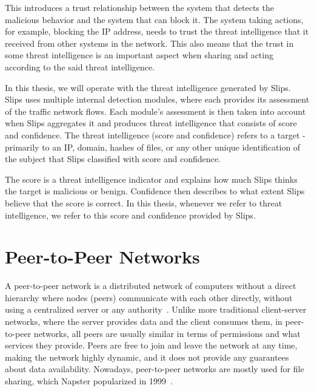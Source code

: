 This introduces a trust relationship between the system that detects the malicious behavior and the system that can block it.
The system taking actions, for example, blocking the IP address, needs to trust the threat intelligence that it received from other systems in the network.
This also means that the trust in some threat intelligence is an important aspect when sharing and acting according to the said threat intelligence.

In this thesis, we will operate with the threat intelligence generated by Slips.
Slips uses multiple internal detection modules, where each provides its assessment of the traffic network flows. 
Each module's assessment is then taken into account when Slips aggregates it and produces threat intelligence that consists of score and confidence.
The threat intelligence (score and confidence) refers to a target - primarily to an IP, domain, hashes of files, or any other unique identification of the subject that Slips classified with score and confidence.

The score is a threat intelligence indicator and explains how much Slips thinks the target is malicious or benign.
Confidence then describes to what extent Slips believe that the score is correct.
In this thesis, whenever we refer to threat intelligence, we refer to this score and confidence provided by Slips.

\section{Peer-to-Peer Networks}
\label{sec:peer-to-peer-networks}
A peer-to-peer network is a distributed network of computers without a direct hierarchy where nodes (peers) communicate with each other directly, without using a centralized server or any authority~\cite{schollmeier}.
Unlike more traditional client-server networks, where the server provides data and the client consumes them, in peer-to-peer networks, all peers are usually similar in terms of permissions and what services they provide.
Peers are free to join and leave the network at any time, making the network highly dynamic, and it does not provide any guarantees about data availability.
Nowadays, peer-to-peer networks are mostly used for file sharing, which Napster popularized in 1999~\cite{saroiu}.